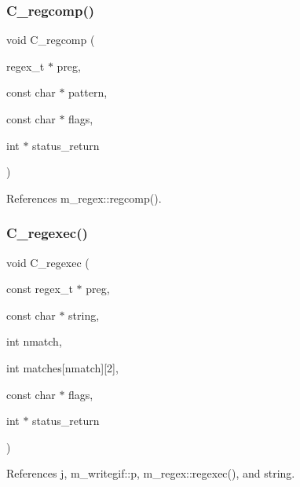 \mbox{\label{C-M__regex_8c_a3fcdbec663d5285a401e73c4cdca37be}} 
\subsubsection{\texorpdfstring{C\+\_\+regcomp()}{C\_regcomp()}}
{\footnotesize\ttfamily void C\+\_\+regcomp (\begin{DoxyParamCaption}\item[{regex\+\_\+t $\ast$}]{preg,  }\item[{const char $\ast$}]{pattern,  }\item[{const char $\ast$}]{flags,  }\item[{int $\ast$}]{status\+\_\+return }\end{DoxyParamCaption})}



References m\+\_\+regex\+::regcomp().

\mbox{\label{C-M__regex_8c_ad4d383ae55d866605fb7ff11e8cf99d8}} 
\subsubsection{\texorpdfstring{C\+\_\+regexec()}{C\_regexec()}}
{\footnotesize\ttfamily void C\+\_\+regexec (\begin{DoxyParamCaption}\item[{const regex\+\_\+t $\ast$}]{preg,  }\item[{const char $\ast$}]{string,  }\item[{int}]{nmatch,  }\item[{int}]{matches\mbox{[}nmatch\mbox{]}\mbox{[}2\mbox{]},  }\item[{const char $\ast$}]{flags,  }\item[{int $\ast$}]{status\+\_\+return }\end{DoxyParamCaption})}



References j, m\+\_\+writegif\+::p, m\+\_\+regex\+::regexec(), and string.

